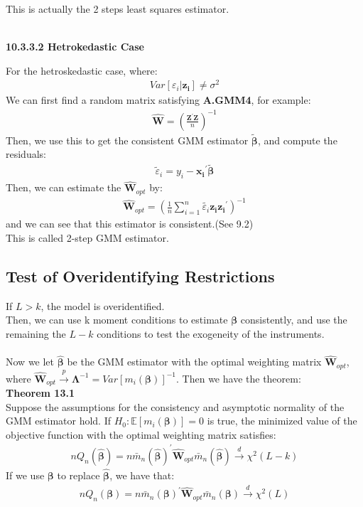 \documentclass{article}
\begin{document}
This is actually the 2 steps least squares estimator.\\\\
\centerline{\textbf{10.3.3.2 Hetrokedastic Case}}
For the hetroskedastic case, where:
	\begin{align*}
		Var[\varepsilon_i | \boldsymbol{z_i}] \neq \sigma^2
	\end{align*}
We can first find a random matrix satisfying \textbf{A.GMM4}, for example:
	\begin{align*}
		\hat{\boldsymbol{W}} = \left( \frac{\boldsymbol{Z}^\prime \boldsymbol{Z}}{n} \right)^{-1}
	\end{align*}
Then, we use this to get the consistent GMM estimator $\tilde{\boldsymbol{\beta}}$, and compute the residuals:
	\begin{align*}
		\tilde{\varepsilon}_i = y_i - \boldsymbol{x_i}^\prime \tilde{\boldsymbol{\beta}}
	\end{align*}
Then, we can estimate the $\hat{\boldsymbol{W}}_{opt}$ by:
	\begin{align*}
		\hat{\boldsymbol{W}}_{opt} = \left( \frac{1}{n}\sum^n_{i=1} \tilde{\varepsilon_i} \boldsymbol{z_i} \boldsymbol{z_i}^\prime \right)^{-1}
	\end{align*}
and we can see that this estimator is consistent.(See 9.2)\\
This is called 2-step GMM estimator.


\subsection{Test of Overidentifying Restrictions}
If $L > k$, the model is overidentified.\\
Then, we can use k moment conditions to estimate $\boldsymbol{\beta}$ consistently, and use the remaining the $L - k$ conditions to test the exogeneity of the instruments.\\\\
Now we let $\hat{\boldsymbol{\beta}}$ be the GMM estimator with the optimal weighting matrix $\hat{\boldsymbol{W}}_{opt}$, where $\hat{\boldsymbol{W}}_{opt} \xrightarrow{p} \boldsymbol{\Lambda}^{-1} = Var[m_i(\boldsymbol{\beta})]^{-1}$. Then we have the theorem:\\
\textbf{Theorem 13.1}\\
Suppose the assumptions for the consistency and asymptotic normality of the GMM estimator hold. If $H_0: \mathbb{E}[m_i(\boldsymbol{\beta})] = 0$ is true, the minimized value of the objective function with the optimal weighting matrix satisfies:
	\begin{align*}
		nQ_n(\hat{\boldsymbol{\beta}}) = n \bar{m}_n(\hat{\boldsymbol{\beta}})^\prime \hat{\boldsymbol{W}}_{opt} \bar{m}_n(\hat{\boldsymbol{\beta}}) \xrightarrow{d} \chi^2 (L-k)
	\end{align*}
If we use $\boldsymbol{\beta}$ to replace $\hat{\boldsymbol{\beta}}$, we have that:
	\begin{align*}
		n Q_n (\boldsymbol{\beta}) = n \bar{m}_n(\boldsymbol{\boldsymbol{\beta}})^\prime \hat{\boldsymbol{W}}_{opt} \bar{m}_n(\boldsymbol{\beta}) \xrightarrow{d} \chi^2(L)
	\end{align*}
\end{document}
